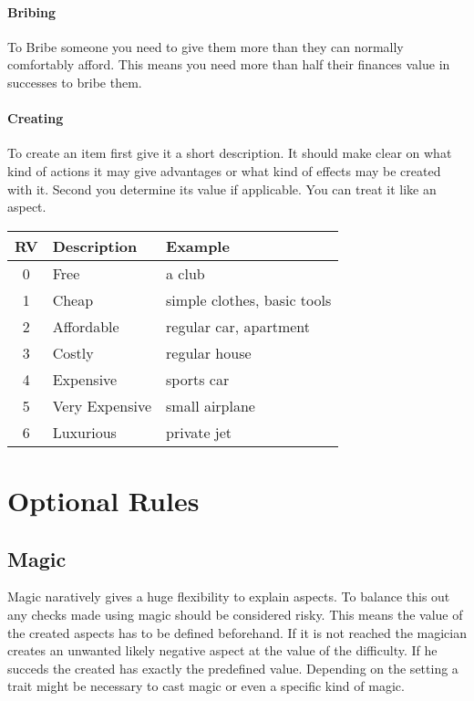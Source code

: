 \documentclass[11pt]{article}
\begin{document}
{\paragraph*{Bribing}
\label{sec:orgb6c5168}
To Bribe someone you need to give them more than they can normally comfortably afford. This means you need more than half their finances value in successes to bribe them.

\paragraph*{Creating}
\label{sec:org9cee26a}
To create an item first give it a short description. It should make clear on what kind of actions it may give advantages or what kind of effects may be created with it. Second you determine its value if applicable. You can treat it like an aspect. 

\begin{center}
\begin{tabular}{c|l|l}
\textbf{RV} & \textbf{Description} & \textbf{Example}\\[0pt]
\hline
0 & Free & a club\\[0pt]
1 & Cheap & simple clothes, basic tools\\[0pt]
2 & Affordable & regular car, apartment\\[0pt]
3 & Costly & regular house\\[0pt]
4 & Expensive & sports car\\[0pt]
5 & Very Expensive & small airplane\\[0pt]
6 & Luxurious & private jet\\[0pt]
\end{tabular}
\end{center}

\section{Optional Rules}
\label{sec:orgcdf80ff}
\subsection{Magic}
\label{sec:org7fd2c96}
Magic naratively gives a huge flexibility to explain aspects. To balance this out any checks made using magic should be considered risky. This means the value of the created aspects has to be defined beforehand. If it is not reached the magician creates an unwanted likely negative aspect at the value of the difficulty. If he succeds the created has exactly the predefined value. Depending on the setting a trait might be necessary to cast magic or even a specific kind of magic.


}
\end{document}
